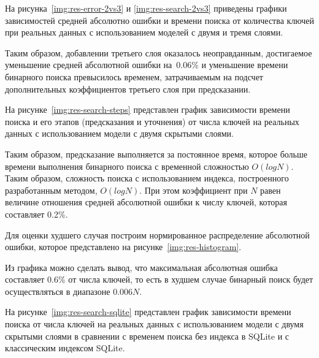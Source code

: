 На рисунка~\ref{img:res-error-2vs3} и \ref{img:res-search-2vs3} приведены
графики зависимостей средней абсолютно ошибки и времени поиска от количества
ключей при реальных данных с использованием моделей с двумя и тремя слоями.



Таким образом, добавлении третьего слоя оказалось неоправданным, достигаемое
уменьшение средней абсолютной ошибки на~0.06\% и уменьшение времени бинарного
поиска превысилось временем, затрачиваемым на подсчет дополнительных
коэффициентов третьего слоя при предсказании.

На рисунке~\ref{img:res-search-steps} представлен график зависимости времени
поиска и его этапов (предсказания и уточнения) от числа ключей на реальных
данных с использованием модели с двумя скрытыми слоями.


Таким образом, предсказание выполняется за постоянное время, которое больше
времени выполнения бинарного поиска с временной сложностью $O(log N)$. Таким
образом, сложность поиска с использованием индекса, построенного разработанным
методом, $O(log N)$. При этом коэффициент при $N$ равен величине отношения
средней абсолютной ошибки к числу ключей, которая составляет 0.2\%.

Для оценки худшего случая построим нормированное распределение абсолютной
ошибки, которое представлено на рисунке~\ref{img:res-histogram}.


Из графика можно сделать вывод, что максимальная абсолютная ошибка составляет
0.6\% от числа ключей, то есть в худшем случае бинарный поиск будет осуществляться
в диапазоне $0.006N$.

На рисунке~\ref{img:res-search-sqlite} представлен график зависимости времени
поиска  от числа ключей на реальных
данных с использованием модели с двумя скрытыми слоями в сравнении с временем
поиска без индекса в SQLite и с классическим индексом SQLite.


